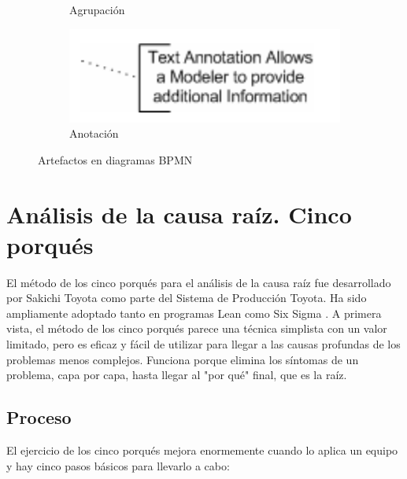 \begin{figure}[H]
\begin{subfigure}[b]{0.3\textwidth}
        \caption{Agrupación}
    \end{subfigure}
    \hfill
    \begin{subfigure}[b]{0.4\textwidth}
        \centering
        \includegraphics[width=\textwidth]{img/bpmn-note.png}
        \caption{Anotación}
    \end{subfigure}
    \caption{Artefactos en diagramas BPMN}
    \label{fig:bpmn-artifacts}
\end{figure}


\section{Análisis de la causa raíz. Cinco porqués}

El método de los cinco porqués para el análisis de la causa raíz fue desarrollado por Sakichi Toyota como parte del Sistema de Producción Toyota.
Ha sido ampliamente adoptado tanto en programas Lean como Six Sigma \cite{tarantino_smart_2022}.
A primera vista, el método de los cinco porqués parece una técnica simplista con un valor limitado, pero es eficaz y fácil de utilizar para llegar a las causas profundas de los problemas menos complejos.
Funciona porque elimina los síntomas de un problema, capa por capa, hasta llegar al "por qué" final, que es la raíz.

\subsection{Proceso}

El ejercicio de los cinco porqués mejora enormemente cuando lo aplica un equipo y hay cinco pasos básicos para llevarlo a cabo:

